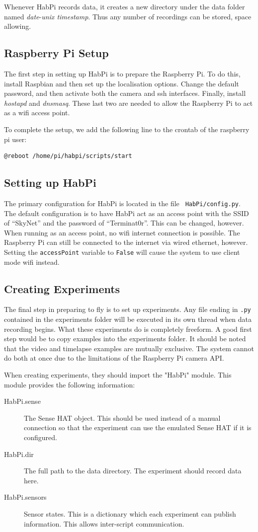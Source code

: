 \documentclass[journal]{new-aiaa}
\begin{document}
Whenever HabPi records data, it creates a new directory under the
data folder named {\em date}-{\em unix timestamp}.  Thus any number of
recordings can be stored, space allowing.

\subsection{Raspberry Pi Setup}
The first step in setting up HabPi is to prepare the Raspberry Pi.
To do this, install Raspbian and then set up the localisation options.
Change the default password, and then activate both the camera and ssh
interfaces.  Finally, install {\em hostapd} and {\em dnsmasq}.  These
last two are needed to allow the Raspberry Pi to act as a wifi access
point.

To complete the setup, we add the following line to the crontab of the
raspberry pi user:
\begin{verbatim}
@reboot /home/pi/habpi/scripts/start
\end{verbatim}

\subsection{Setting up HabPi}
The primary configuration for HabPi is located in the file {\tt
HabPi/config.py}.  The default configuration is to have HabPi act as
an access point with the SSID of ``SkyNet'' and the password of
``Terminat0r''. This can be changed, however.  When running as an
access point, no wifi internet connection is possible.  The Raspberry
Pi can still be connected to the internet via wired ethernet, however.
Setting the {\tt accessPoint} variable to {\tt False} will cause the
system to use client mode wifi instead.  

\subsection{Creating Experiments}
The final step in preparing to fly is to set up experiments.  Any
file ending in {\tt.py} contained in the experiments folder will be
executed in its own thread when data recording begins.  What these
experiments do is completely freeform.  A good first step would be to
copy examples into the experiments folder.  It should be noted that
the video and timelapse examples are mutually exclusive.  The system
cannot do both at once due to the limitations of the Raspberry Pi
camera API.

When creating experiments, they should import the "HabPi" module.
This module provides the following information:
\begin{description}
    \item[HabPi.sense] The Sense HAT object.  This should be used
    instead of a manual connection so that the experiment can use the
    emulated Sense HAT if it is configured.
    \item[HabPi.dir] The full path to the data directory.  The
    experiment should record data here.
    \item[HabPi.sensors] Sensor states.  This is a dictionary which
    each experiment can publish information.  This allows inter-script
    communication.
\end{description}
\end{document}
